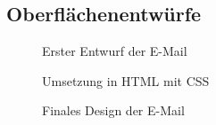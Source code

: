 \subsection{Oberflächenentwürfe}
\label{app:Entwuerfe}
\begin{figure}[htb]
\centering
{}
\caption{Erster Entwurf der E-Mail}
\end{figure}

\begin{figure}[htb]
\centering
{}
\caption{Umsetzung in HTML mit CSS}
\end{figure}

\begin{figure}[htb]
\centering
{}
\caption{Finales Design der E-Mail}
\end{figure}
